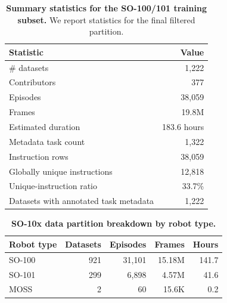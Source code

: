 \begin{table}[ht]
\centering
\footnotesize
\caption{\textbf{Summary statistics for the SO-100/101 training subset.} We
report statistics for the final filtered \molmoacttsodata partition.}
\setlength{\tabcolsep}{6pt}
\renewcommand{\arraystretch}{1.1}
\begin{tabular}{lr}
\textbf{Statistic} & \textbf{Value} \\
\midrule
\# datasets & 1{,}222 \\
Contributors & 377 \\
Episodes & 38{,}059 \\
Frames & 19.8M \\
Estimated duration & 183.6 hours \\
Metadata task count & 1{,}322 \\
Instruction rows & 38{,}059 \\
Globally unique instructions & 12{,}818 \\
Unique-instruction ratio & 33.7\% \\
Datasets with annotated task metadata & 1{,}222 \\
\end{tabular}
\label{tab:so100-so101-summary}
\end{table}

\begin{table}[t]
\centering
\footnotesize
\caption{\textbf{SO-10x data partition breakdown by robot type.}}
\setlength{\tabcolsep}{5pt}
\renewcommand{\arraystretch}{1.1}
\begin{tabular}{lrrrr}
\textbf{Robot type} & \textbf{Datasets} & \textbf{Episodes} & \textbf{Frames} & \textbf{Hours} \\
\midrule
SO-100 & 921 & 31{,}101 & 15.18M & 141.7 \\
SO-101 & 299 & 6{,}898 & 4.57M & 41.6 \\
MOSS & 2 & 60 & 15.6K & 0.2 \\
\end{tabular}
\label{tab:so100-so101-robot-type}
\end{table}



